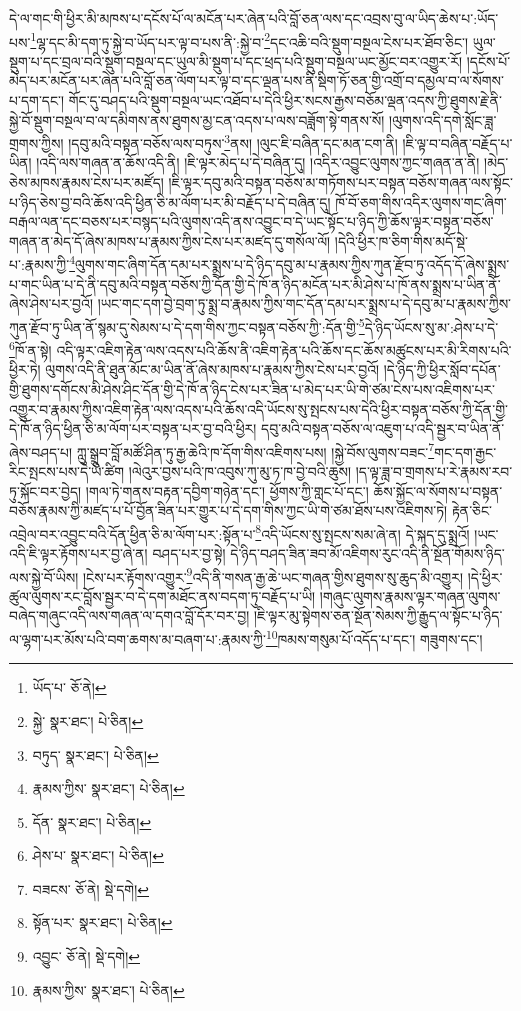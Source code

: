དེ་ལ་གང་གི་ཕྱིར་མི་མཁས་པ་དངོས་པོ་ལ་མངོན་པར་ཞེན་པའི་བློ་ཅན་ལས་དང་འབྲས་བུ་ལ་ཡིད་ཆེས་པ་:ཡོད་པས་\footnote{ཡོད་པ་  ཅོ་ནེ། }ལྷ་དང་མི་དག་ཏུ་སྐྱེ་བ་ཡོད་པར་ལྟ་བ་པས་ནི་:སྐྱེ་བ་\footnote{སྐྱེ་  སྣར་ཐང་།  པེ་ཅིན། }དང་འཆི་བའི་སྡུག་བསྔལ་ངེས་པར་ཐོབ་ཅིང་། ཡུལ་སྡུག་པ་དང་བྲལ་བའི་སྡུག་བསྔལ་དང་ཡུལ་མི་སྡུག་པ་དང་ཕྲད་པའི་སྡུག་བསྔལ་ཡང་མྱོང་བར་འགྱུར་རོ། །དངོས་པོ་མེད་པར་མངོན་པར་ཞེན་པའི་བློ་ཅན་ལོག་པར་ལྟ་བ་དང་ལྡན་པས་ནི་སྡིག་ཏོ་ཅན་གྱི་འགྲོ་བ་དམྱལ་བ་ལ་སོགས་པ་དག་དང་། གོང་དུ་བཤད་པའི་སྡུག་བསྔལ་ཡང་འཐོབ་པ་དེའི་ཕྱིར་སངས་རྒྱས་བཅོམ་ལྡན་འདས་ཀྱི་ཐུགས་རྗེ་ནི་སྐྱེ་བོ་སྡུག་བསྔལ་བ་ལ་དམིགས་ནས་ཐུགས་མྱ་ངན་འདས་པ་ལས་བཟློག་སྟེ་གནས་སོ། །ལུགས་འདི་དགེ་སློང་ཟླ་གྲགས་ཀྱིས། །དབུ་མའི་བསྟན་བཅོས་ལས་བཏུས་\footnote{བཏུད་  སྣར་ཐང་།  པེ་ཅིན། }ནས། །ལུང་ཇི་བཞིན་དང་མན་ངག་ནི། །ཇི་ལྟ་བ་བཞིན་བརྗོད་པ་ཡིན། །འདི་ལས་གཞན་ན་ཆོས་འདི་ནི། །ཇི་ལྟར་མེད་པ་དེ་བཞིན་དུ། །འདིར་འབྱུང་ལུགས་ཀྱང་གཞན་ན་ནི། །མེད་ཅེས་མཁས་རྣམས་ངེས་པར་མཛོད། །ཇི་ལྟར་དབུ་མའི་བསྟན་བཅོས་མ་གཏོགས་པར་བསྟན་བཅོས་གཞན་ལས་སྟོང་པ་ཉིད་ཅེས་བྱ་བའི་ཆོས་འདི་ཕྱིན་ཅི་མ་ལོག་པར་མི་བརྗོད་པ་དེ་བཞིན་དུ། ཁོ་བོ་ཅག་གིས་འདིར་ལུགས་གང་ཞིག་བརྒལ་ལན་དང་བཅས་པར་བསྙད་པའི་ལུགས་འདི་ནས་འབྱུང་བ་དེ་ཡང་སྟོང་པ་ཉིད་ཀྱི་ཆོས་ལྟར་བསྟན་བཅོས་གཞན་ན་མེད་དོ་ཞེས་མཁས་པ་རྣམས་ཀྱིས་ངེས་པར་མཛད་དུ་གསོལ་ལོ། །དེའི་ཕྱིར་ཁ་ཅིག་གིས་མདོ་སྡེ་པ་:རྣམས་ཀྱི་\footnote{རྣམས་ཀྱིས་  སྣར་ཐང་།  པེ་ཅིན། }ལུགས་གང་ཞིག་དོན་དམ་པར་སྨྲས་པ་དེ་ཉིད་དབུ་མ་པ་རྣམས་ཀྱིས་ཀུན་རྫོབ་ཏུ་འདོད་དོ་ཞེས་སྨྲས་པ་གང་ཡིན་པ་དེ་ནི་དབུ་མའི་བསྟན་བཅོས་ཀྱི་དོན་གྱི་དེ་ཁོ་ན་ཉིད་མངོན་པར་མི་ཤེས་པ་ཁོ་ནས་སྨྲས་པ་ཡིན་ནོ་ཞེས་ཤེས་པར་བྱའོ། །ཡང་གང་དག་བྱེ་བྲག་ཏུ་སྨྲ་བ་རྣམས་ཀྱིས་གང་དོན་དམ་པར་སྨྲས་པ་དེ་དབུ་མ་པ་རྣམས་ཀྱིས་ཀུན་རྫོབ་ཏུ་ཡིན་ནོ་སྙམ་དུ་སེམས་པ་དེ་དག་གིས་ཀྱང་བསྟན་བཅོས་ཀྱི་:དོན་གྱི་\footnote{དོན་  སྣར་ཐང་།  པེ་ཅིན། }དེ་ཉིད་ཡོངས་སུ་མ་:ཤེས་པ་དེ་\footnote{ཤེས་པ་  སྣར་ཐང་།  པེ་ཅིན། }ཁོ་ན་སྟེ། འདི་ལྟར་འཇིག་རྟེན་ལས་འདས་པའི་ཆོས་ནི་འཇིག་རྟེན་པའི་ཆོས་དང་ཆོས་མཚུངས་པར་མི་རིགས་པའི་ཕྱིར་ཏེ། ལུགས་འདི་ནི་ཐུན་མོང་མ་ཡིན་ནོ་ཞེས་མཁས་པ་རྣམས་ཀྱིས་ངེས་པར་བྱའོ། །དེ་ཉིད་ཀྱི་ཕྱིར་སློབ་དཔོན་གྱི་ཐུགས་དགོངས་མི་ཤེས་ཤིང་དོན་གྱི་དེ་ཁོ་ན་ཉིད་ངེས་པར་ཟིན་པ་མེད་པར་ཡི་གེ་ཙམ་ངེས་པས་འཇིགས་པར་འགྱུར་བ་རྣམས་ཀྱིས་འཇིག་རྟེན་ལས་འདས་པའི་ཆོས་འདི་ཡོངས་སུ་སྤངས་པས་དེའི་ཕྱིར་བསྟན་བཅོས་ཀྱི་དོན་གྱི་དེ་ཁོ་ན་ཉིད་ཕྱིན་ཅི་མ་ལོག་པར་བསྟན་པར་བྱ་བའི་ཕྱིར། དབུ་མའི་བསྟན་བཅོས་ལ་འཇུག་པ་འདི་སྦྱར་བ་ཡིན་ནོ་ཞེས་བཤད་པ། ཀླུ་སྒྲུབ་བློ་མཚོ་ཤིན་ཏུ་རྒྱ་ཆེའི་ཁ་དོག་གིས་འཇིགས་པས། །སྐྱེ་བོས་ལུགས་བཟང་\footnote{བཟངས་  ཅོ་ནེ།  སྡེ་དགེ། }གང་དག་རྒྱང་རིང་སྤངས་པས་དེ་ཡི་ཚིག །ལེའུར་བྱས་པའི་ཁ་འབུས་ཀུ་མུ་ཏ་ཁ་བྱེ་བའི་ཆུས། །ད་ལྟ་ཟླ་བ་གྲགས་པ་རེ་རྣམས་རབ་ཏུ་སྐོང་བར་བྱེད། །གལ་ཏེ་གནས་བརྟན་དབྱིག་གཉེན་དང་། ཕྱོགས་ཀྱི་གླང་པོ་དང་། ཆོས་སྐྱོང་ལ་སོགས་པ་བསྟན་བཅོས་རྣམས་ཀྱི་མཛད་པ་པོ་བྱོན་ཟིན་པར་གྱུར་པ་དེ་དག་གིས་ཀྱང་ཡི་གེ་ཙམ་ཐོས་པས་འཇིགས་ཏེ། རྟེན་ཅིང་འབྲེལ་བར་འབྱུང་བའི་དོན་ཕྱིན་ཅི་མ་ལོག་པར་:སྟོན་པ་\footnote{སྟོན་པར་  སྣར་ཐང་།  པེ་ཅིན། }འདི་ཡོངས་སུ་སྤངས་སམ་ཞེ་ན། དེ་སྐད་དུ་སྨྲའོ། །ཡང་འདི་ཇི་ལྟར་རྟོགས་པར་བྱ་ཞེ་ན། བཤད་པར་བྱ་སྟེ། དེ་ཉིད་བཤད་ཟིན་ཟབ་མོ་འཇིགས་རུང་འདི་ནི་སྔོན་གོམས་ཉིད་ལས་སྐྱེ་བོ་ཡིས། །ངེས་པར་རྟོགས་འགྱུར་\footnote{འབྱུང་  ཅོ་ནེ།  སྡེ་དགེ། }འདི་ནི་གསན་རྒྱ་ཆེ་ཡང་གཞན་གྱིས་ཐུགས་སུ་ཆུད་མི་འགྱུར། །དེ་ཕྱིར་ཚུལ་ལུགས་རང་བློས་སྦྱར་བ་དེ་དག་མཐོང་ནས་བདག་ཏུ་བརྗོད་པ་ཡི། །གཞུང་ལུགས་རྣམས་ལྟར་གཞན་ལུགས་བཞེད་གཞུང་འདི་ལས་གཞན་ལ་དགའ་བློ་དོར་བར་བྱ། །ཇི་ལྟར་མུ་སྟེགས་ཅན་སྔོན་སེམས་ཀྱི་རྒྱུད་ལ་སྟོང་པ་ཉིད་ལ་ལྷག་པར་མོས་པའི་བག་ཆགས་མ་བཞག་པ་:རྣམས་ཀྱི་\footnote{རྣམས་ཀྱིས་  སྣར་ཐང་།  པེ་ཅིན། }ཁམས་གསུམ་པོ་འདོད་པ་དང་། གཟུགས་དང་། 